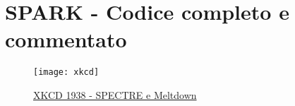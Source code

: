 \appendix
\chapter{SPARK - Codice completo e commentato}

	
	
	\cleardoublepage
	\thispagestyle{empty}
	\begin{figure}
		\begin{center}
			\texttt{[image: xkcd]}
			\caption[XKCD 1938 - SPECTRE e Meltdown]{\href{https://xkcd.com/1938/}{XKCD 1938 - SPECTRE e Meltdown}}
		\end{center}
	\end{figure}